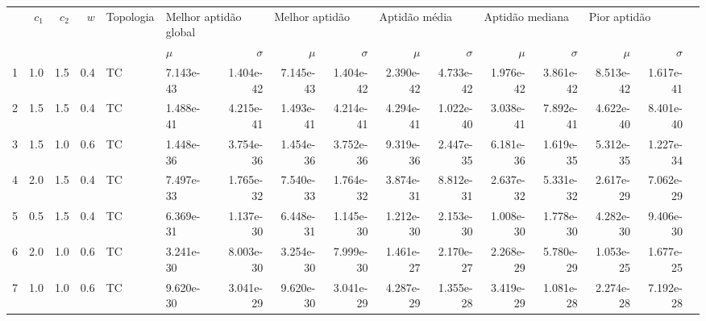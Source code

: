 \begin{tabular}{lrrrllrrrrrrrrrr}
\toprule
{} & $c_1$ & $c_2$ & $w$ & Topologia & \multicolumn{2}{l}{Melhor aptidão global} & \multicolumn{2}{l}{Melhor aptidão} & \multicolumn{2}{l}{Aptidão média} & \multicolumn{2}{l}{Aptidão mediana} & \multicolumn{2}{l}{Pior aptidão}                                      \\
{} &       &       &     &           & $\mu$                                     & $\sigma$                           & $\mu$                             & $\sigma$                            & $\mu$     & $\sigma$  & $\mu$     & $\sigma$  & $\mu$     & $\sigma$  \\
\midrule
1  & 1.0   & 1.5   & 0.4 & TC        & 7.143e-43                                 & 1.404e-42                          & 7.145e-43                         & 1.404e-42                           & 2.390e-42 & 4.733e-42 & 1.976e-42 & 3.861e-42 & 8.513e-42 & 1.617e-41 \\
2  & 1.5   & 1.5   & 0.4 & TC        & 1.488e-41                                 & 4.215e-41                          & 1.493e-41                         & 4.214e-41                           & 4.294e-41 & 1.022e-40 & 3.038e-41 & 7.892e-41 & 4.622e-40 & 8.401e-40 \\
3  & 1.5   & 1.0   & 0.6 & TC        & 1.448e-36                                 & 3.754e-36                          & 1.454e-36                         & 3.752e-36                           & 9.319e-36 & 2.447e-35 & 6.181e-36 & 1.619e-35 & 5.312e-35 & 1.227e-34 \\
4  & 2.0   & 1.5   & 0.4 & TC        & 7.497e-33                                 & 1.765e-32                          & 7.540e-33                         & 1.764e-32                           & 3.874e-31 & 8.812e-31 & 2.637e-32 & 5.331e-32 & 2.617e-29 & 7.062e-29 \\
5  & 0.5   & 1.5   & 0.4 & TC        & 6.369e-31                                 & 1.137e-30                          & 6.448e-31                         & 1.145e-30                           & 1.212e-30 & 2.153e-30 & 1.008e-30 & 1.778e-30 & 4.282e-30 & 9.406e-30 \\
6  & 2.0   & 1.0   & 0.6 & TC        & 3.241e-30                                 & 8.003e-30                          & 3.254e-30                         & 7.999e-30                           & 1.461e-27 & 2.170e-27 & 2.268e-29 & 5.780e-29 & 1.053e-25 & 1.677e-25 \\
7  & 1.0   & 1.0   & 0.6 & TC        & 9.620e-30                                 & 3.041e-29                          & 9.620e-30                         & 3.041e-29                           & 4.287e-29 & 1.355e-28 & 3.419e-29 & 1.081e-28 & 2.274e-28 & 7.192e-28 \\

\end{tabular}
